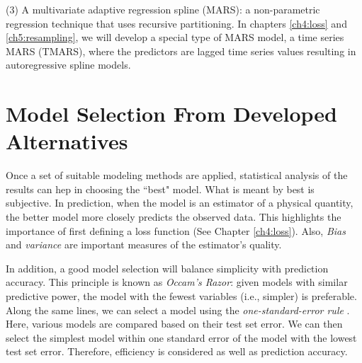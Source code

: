 (3) A multivariate adaptive regression spline (MARS): a non-parametric regression technique that uses recursive partitioning. In chapters \ref{ch4:loss} and \ref{ch5:resampling}, we will develop a special type of MARS model, a time series MARS (TMARS), where the predictors are lagged time series values resulting in autoregressive spline models.


\section{Model Selection From Developed Alternatives}
Once a set of suitable modeling methods are applied, statistical analysis of the results can hep in choosing the ``best" model. What is meant by best is subjective. In prediction, when the model is an estimator of a physical quantity, the better model more closely predicts the observed data. This highlights the importance of first defining a loss function (See Chapter \ref{ch4:loss}). Also, \textit{Bias} and \textit{variance} are important measures of the estimator's quality.  

In addition, a good model selection will balance simplicity with prediction accuracy. This principle is known as \textit{Occam's Razor}: given models with similar predictive power, the model with the fewest variables (i.e., simpler) is preferable. Along the same lines, we can select a model using the \textit{one-standard-error rule} \cite{friedman2001elements}. Here, various models are compared based on their test set error. We can then select the simplest model within one standard error of the model with the lowest test set error. Therefore, efficiency is considered as well as prediction accuracy. 




